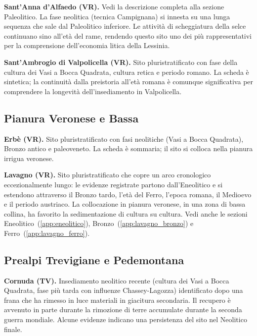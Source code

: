 \textbf{Sant'Anna d'Alfaedo (VR).} \label{app:alfaedo_neo} Vedi la descrizione completa alla sezione Paleolitico. La fase neolitica (tecnica Campignana) si innesta su una lunga sequenza che sale dal Paleolitico inferiore. Le attività di scheggiatura della selce continuano sino all'età del rame, rendendo questo sito uno dei più rappresentativi per la comprensione dell'economia litica della Lessinia.

\textbf{Sant'Ambrogio di Valpolicella (VR).} \label{app:santambrogio_neo} Sito pluristratificato con fase della cultura dei Vasi a Bocca Quadrata, cultura retica e periodo romano. La scheda è sintetica; la continuità dalla preistoria all'età romana è comunque significativa per comprendere la longevità dell'insediamento in Valpolicella.

\subsection{Pianura Veronese e Bassa}

\textbf{Erbè (VR).} \label{app:erbe} Sito pluristratificato con fasi neolitiche (Vasi a Bocca Quadrata), Bronzo antico e paleoveneto. La scheda è sommaria; il sito si colloca nella pianura irrigua veronese.

\textbf{Lavagno (VR).} \label{app:lavagno} Sito pluristratificato che copre un arco cronologico eccezionalmente lungo: le evidenze registrate partono dall'Eneolitico e si estendono attraverso il Bronzo tardo, l'età del Ferro, l'epoca romana, il Medioevo e il periodo austriaco. La collocazione in pianura veronese, in una zona di bassa collina, ha favorito la sedimentazione di cultura su cultura. Vedi anche le sezioni Eneolitico~(\ref{app:eneolitico}), Bronzo~(\ref{app:lavagno_bronzo}) e Ferro~(\ref{app:lavagno_ferro}).

\subsection{Prealpi Trevigiane e Pedemontana}

\textbf{Cornuda (TV).} Insediamento neolitico recente (cultura dei Vasi a Bocca Quadrata, fase più tarda con influenze Chassey-Lagozza) identificato dopo una frana che ha rimesso in luce materiali in giacitura secondaria. Il recupero è avvenuto in parte durante la rimozione di terre accumulate durante la seconda guerra mondiale. Alcune evidenze indicano una persistenza del sito nel Neolitico finale.

